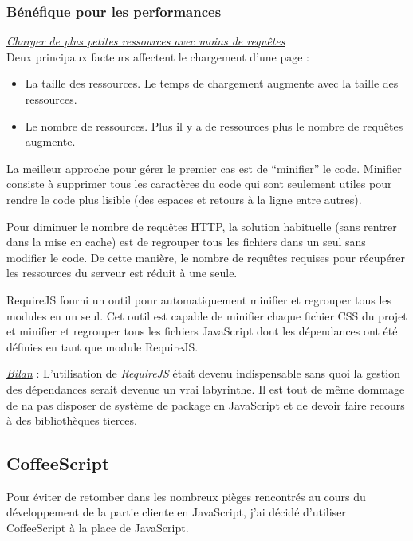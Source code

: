 \subsubsection{Bénéfique pour les performances}

\textit{\underline{Charger de plus petites ressources avec moins de requêtes}}\\

Deux principaux facteurs affectent le chargement d'une page :
\begin{itemize}
\item La taille des ressources. Le temps de chargement augmente avec la taille
  des ressources.
\item Le nombre de ressources. Plus il y a de ressources plus le nombre de
  requêtes augmente.
\end{itemize}

La meilleur approche pour gérer le premier cas est de ``minifier'' le code.
Minifier consiste à supprimer tous les caractères du code qui sont seulement
utiles pour rendre le code plus lisible (des espaces et retours à la ligne
entre autres).

Pour diminuer le nombre de requêtes HTTP, la solution habituelle (sans rentrer
dans la mise en cache) est de regrouper tous les fichiers dans un seul sans
modifier le code. De cette manière, le nombre de requêtes requises pour
récupérer les ressources du serveur est réduit à une seule.

RequireJS fourni un outil pour automatiquement minifier et
regrouper tous les modules en un seul. Cet outil est capable de minifier chaque
fichier CSS du projet et minifier et regrouper tous les fichiers JavaScript dont
les dépendances ont été définies en tant que module RequireJS.

\underline{\textit{Bilan}} : L'utilisation de \textit{RequireJS} était devenu
indispensable sans quoi la gestion des dépendances serait devenue un vrai
labyrinthe. Il est tout de même dommage de na pas disposer de système de package
en JavaScript et de devoir faire recours à des bibliothèques tierces.

\subsection{CoffeeScript}

Pour éviter de retomber dans les nombreux pièges rencontrés au cours du
développement de la partie cliente en JavaScript, j'ai décidé d'utiliser
CoffeeScript à la place de JavaScript.

